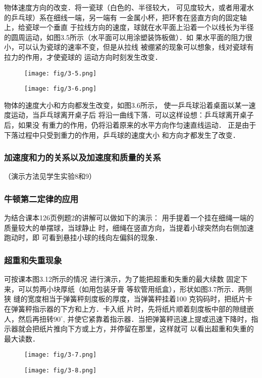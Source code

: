 物体速度方向的改变．将一瓷球（白色的、半径较大，
可见度较大，或者用灌水的乒乓球）系在细线一端，另一端有
一金属小杯，把环套在竖直方向的固定轴上，给瓷球一个垂直
于拉线方向的速度，球就在水平面上沿着一个以线长为半径
的圆周运动，如图3.5所示（水平面可以用涂塑装饰板做）．如
果水平面的阻力很小，可以认为瓷球的速率不变，但是从拉线
被绷紧的现象可以想象，线对瓷球有拉力的作用，才使瓷球的
运动方向时刻发生改变．
\begin{figure}[htp]\centering
    \begin{minipage}[t]{0.48\textwidth}
    \centering
    \texttt{[image: fig/3-5.png]}
    \caption{}
    \end{minipage}
    \begin{minipage}[t]{0.48\textwidth}
    \centering
    \texttt{[image: fig/3-6.png]}
    \caption{}
    \end{minipage}
    \end{figure}

物体的速度大小和方向都发生改变，如图3.6所示，
使一乒乓球沿着桌面以某一速度运动，当乒乓球离开桌子后
将沿一曲线下落．可以这样设想：乒乓球离开桌子后，如果没
有重力的作用，仍将沿着原来的水平方向作匀速直线运动．
正是由于下落过程中只受到重力的作用，乒乓球的速度大小
和方向才都发生了改变．

\subsubsection{加速度和力的关系以及加速度和质量的关系}
（演示方法见学生实验8和9）

\subsubsection{牛顿第二定律的应用}
为结合课本126页例题2的讲解可以做如下的演示：
用手提着一个挂在细绳一端的质量较大的单摆球，当球静止
时，细绳在竖直方向，当提着小球突然向右侧加速跑动时，即
可看到悬挂小球的线向左偏斜的现象．

\subsubsection{超重和失重现象}

可按课本图3.12所示的情况
进行演示，为了能把超重和失重的最大续数
固定下来，可以剪两小块厚纸（如用包装牙膏
等软管用纸盒），形状如图3.7所示．两侧狭
缝的宽度相当于弹簧秤刻度板的厚度，当弹簧秤挂着100
克钩码时，把纸片卡在弹簧秤指示器的下方和上方．卡入纸
片时，先将纸片顺着刻度板中部的隙缝嵌人，然后再扭转$90^{\circ}$,
并使它紧靠着指示器．当把弹簧秤迅速上提或迅速下降时，指
示器就会把纸片推向下方或上方，并停留在那里，这样就可
以看出超重和失重的最大读数．
\begin{figure}[htp]\centering
    \begin{minipage}[t]{0.48\textwidth}
    \centering
    \texttt{[image: fig/3-7.png]}
    \caption{}
    \end{minipage}
    \begin{minipage}[t]{0.48\textwidth}
    \centering
    \texttt{[image: fig/3-8.png]}
    \caption{}
    \end{minipage}
    \end{figure}

